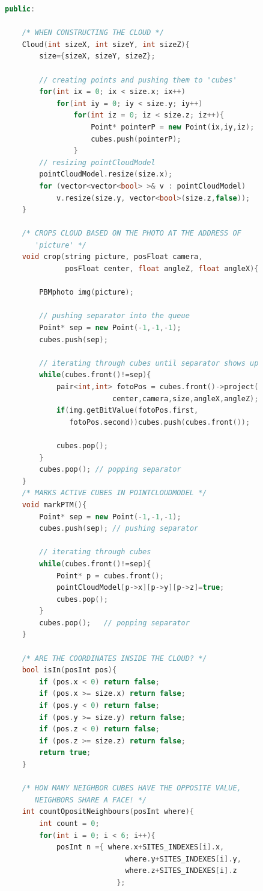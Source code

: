 \documentclass[12pt]{report}			%
\begin{document}
\begin{appendices}
\begin{lstlisting}[language = C++]
public:

    /* WHEN CONSTRUCTING THE CLOUD */
    Cloud(int sizeX, int sizeY, int sizeZ){
        size={sizeX, sizeY, sizeZ};
       
        // creating points and pushing them to 'cubes'
        for(int ix = 0; ix < size.x; ix++)
            for(int iy = 0; iy < size.y; iy++)
                for(int iz = 0; iz < size.z; iz++){
                    Point* pointerP = new Point(ix,iy,iz);
                    cubes.push(pointerP);
                }
        // resizing pointCloudModel
        pointCloudModel.resize(size.x);
        for (vector<vector<bool> >& v : pointCloudModel)
            v.resize(size.y, vector<bool>(size.z,false));
    }

    /* CROPS CLOUD BASED ON THE PHOTO AT THE ADDRESS OF
       'picture' */
    void crop(string picture, posFloat camera,
              posFloat center, float angleZ, float angleX){
        
        PBMphoto img(picture);

        // pushing separator into the queue
        Point* sep = new Point(-1,-1,-1);
        cubes.push(sep);
        
        // iterating through cubes until separator shows up
        while(cubes.front()!=sep){ 
            pair<int,int> fotoPos = cubes.front()->project(
                         center,camera,size,angleX,angleZ); 
            if(img.getBitValue(fotoPos.first,
               fotoPos.second))cubes.push(cubes.front());
            
            cubes.pop();
        }
        cubes.pop(); // popping separator 
    }
    /* MARKS ACTIVE CUBES IN POINTCLOUDMODEL */
    void markPTM(){
        Point* sep = new Point(-1,-1,-1);
        cubes.push(sep); // pushing separator

        // iterating through cubes
        while(cubes.front()!=sep){
            Point* p = cubes.front();
            pointCloudModel[p->x][p->y][p->z]=true;
            cubes.pop();
        }
        cubes.pop();   // popping separator
    }

    /* ARE THE COORDINATES INSIDE THE CLOUD? */
    bool isIn(posInt pos){
        if (pos.x < 0) return false;
        if (pos.x >= size.x) return false;
        if (pos.y < 0) return false;
        if (pos.y >= size.y) return false;
        if (pos.z < 0) return false;
        if (pos.z >= size.z) return false;
        return true;
    }

    /* HOW MANY NEIGHBOR CUBES HAVE THE OPPOSITE VALUE,
       NEIGHBORS SHARE A FACE! */ 
    int countOpositNeighbours(posInt where){
        int count = 0;
        for(int i = 0; i < 6; i++){
            posInt n ={ where.x+SITES_INDEXES[i].x,
                            where.y+SITES_INDEXES[i].y,
                            where.z+SITES_INDEXES[i].z
                          };
            

\end{lstlisting}
\end{appendices}
\end{document}
